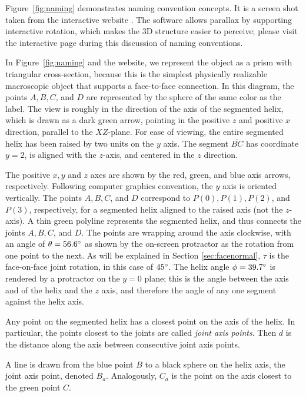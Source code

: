 \documentclass[mathematics,article,submit,pdftex,moreauthors]{Definitions/mdpi}
\begin{document}
Figure~\ref{fig:naming} demonstrates naming convention concepts.
It is a screen shot taken from the interactive website \cite{segmentedhelixinteractive}.
The software allows parallax by supporting interactive rotation,
which makes the 3D structure easier to perceive;
please visit the interactive page during this discussion of naming conventions.

In Figure~\ref{fig:naming} and the website, we represent the object as a prism
with triangular cross-section, because this is
the simplest physically realizable macroscopic object that supports a face-to-face connection.
In this diagram, the
points $A,B,C$, and $D$ are represented by the sphere of the same color as the label. The view is roughly in the direction of
the axis of the segmented helix, which is drawn as a dark green arrow, pointing in the positive $z$ and positive $x$ direction,
parallel to the $XZ$-plane.
For ease of viewing, the entire segmented helix has been raised by two units on the $y$ axis.
The segment $\overline{BC}$ has coordinate $y = 2$, is aligned with the $z$-axis, and centered in the $z$ direction.

The positive $x,y$ and $z$ axes are shown by the red, green, and blue axis arrows, respectively.
Following computer graphics convention, the $y$ axis is oriented vertically.
The points $A,B,C$, and $D$ correspond to $P(0), P(1), P(2)$, and $ P(3)$, respectively,
for a segmented helix aligned
to the raised axis (not the $z$-axis).
A thin green polyline represents the segmented helix, and thus connects the joints $A,B,C$, and $D$.
The points are wrapping around the axis clockwise, with an angle of $\theta = 56.6 \degree$ as
shown by the on-screen protractor as the rotation from one point to the next. As will be explained in Section \ref{sec:facenormal},
$\tau$ is the face-on-face joint rotation, in this case of $45 \degree$.
The helix angle $\phi = 39.7 \degree$ is rendered by a protractor on the $y = 0$ plane;
this is the angle between the axis
and of the helix and the $z$ axis, and therefore the angle of any one segment against the helix axis.

Any point on the segmented helix has a closest point on the axis of the helix.
In particular, the points closest to the
joints are called {\em joint axis points}.
Then $d$ is the distance along the axis between consecutive joint axis points.

A line is drawn from the blue point $B$ to a black sphere on the helix axis,
the joint axis point, denoted $B_a$. Analogously, $C_a$ is the point
on the axis closest to the green point $C$.
\end{document}
